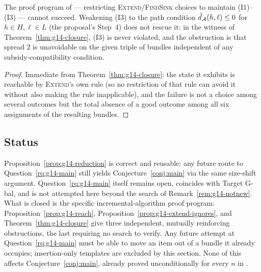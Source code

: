 \begin{corollary}
\label{cor:g14-closed}
The proof program of  --- restricting
\textsc{Extend}/\textsc{FindSink} choices to maintain (I1)--(I3) --- cannot
succeed. Weakening (I3) to the path condition
$\tilde d_{\mathcal{A}}(h,\ell)\le 0$ for $h\in H,\ell\in L$ (the proposal's
Step~4) does not rescue it: in the witness of
Theorem~\ref{thm:g14-closure}, (I3) is never violated, and the obstruction is
that spread $2$ is unavoidable on the given triple of bundles independent of
any subsidy-compatibility condition.
\end{corollary}
\begin{proof}
Immediate from Theorem~\ref{thm:g14-closure}: the state it exhibits is
reachable by \textsc{Extend}'s own rule (so no restriction of that rule can
avoid it without also making the rule inapplicable), and the failure is not
a choice among several outcomes but the total absence of a good outcome
among all six assignments of the resulting bundles.
\end{proof}

\subsection{Status}
\label{sec:g14-status}

Proposition~\ref{prop:g14-reduction} is correct and reusable: any future
route to Question~\ref{rq:g14-main} still yields Conjecture~\ref{conj:main}
via the same size-shift argument. Question~\ref{rq:g14-main} itself remains
open, coincides with Target G-bal, and is not attempted here beyond the
search of Remark~\ref{rem:g14-notnew}. What is closed is the specific
incremental-algorithm proof program: Proposition~\ref{prop:g14-reach},
Proposition~\ref{prop:g14-extend-ignores}, and Theorem~\ref{thm:g14-closure}
give three independent, mutually reinforcing obstructions, the last
requiring no search to verify. Any future attempt at
Question~\ref{rq:g14-main} must be able to move an item out of a bundle it
already occupies; insertion-only templates are excluded by this section.
None of this affects Conjecture~\ref{conj:main}, already proved
unconditionally for every $n$ in .
